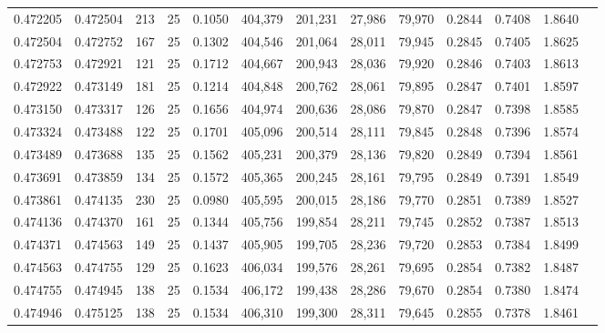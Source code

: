 \begin{tabular}{rrrrrrrrrrrrr}
0.472205 & 0.472504 &   213 &  25 &                                     0.1050 & 404,379 & 201,231 &  27,986 &  79,970 & 0.2844 & 0.7408 & 1.8640 \\
0.472504 & 0.472752 &   167 &  25 &                                     0.1302 & 404,546 & 201,064 &  28,011 &  79,945 & 0.2845 & 0.7405 & 1.8625 \\
0.472753 & 0.472921 &   121 &  25 &                                     0.1712 & 404,667 & 200,943 &  28,036 &  79,920 & 0.2846 & 0.7403 & 1.8613 \\
0.472922 & 0.473149 &   181 &  25 &                                     0.1214 & 404,848 & 200,762 &  28,061 &  79,895 & 0.2847 & 0.7401 & 1.8597 \\
0.473150 & 0.473317 &   126 &  25 &                                     0.1656 & 404,974 & 200,636 &  28,086 &  79,870 & 0.2847 & 0.7398 & 1.8585 \\
0.473324 & 0.473488 &   122 &  25 &                                     0.1701 & 405,096 & 200,514 &  28,111 &  79,845 & 0.2848 & 0.7396 & 1.8574 \\
0.473489 & 0.473688 &   135 &  25 &                                     0.1562 & 405,231 & 200,379 &  28,136 &  79,820 & 0.2849 & 0.7394 & 1.8561 \\
0.473691 & 0.473859 &   134 &  25 &                                     0.1572 & 405,365 & 200,245 &  28,161 &  79,795 & 0.2849 & 0.7391 & 1.8549 \\
0.473861 & 0.474135 &   230 &  25 &                                     0.0980 & 405,595 & 200,015 &  28,186 &  79,770 & 0.2851 & 0.7389 & 1.8527 \\
0.474136 & 0.474370 &   161 &  25 &                                     0.1344 & 405,756 & 199,854 &  28,211 &  79,745 & 0.2852 & 0.7387 & 1.8513 \\
0.474371 & 0.474563 &   149 &  25 &                                     0.1437 & 405,905 & 199,705 &  28,236 &  79,720 & 0.2853 & 0.7384 & 1.8499 \\
0.474563 & 0.474755 &   129 &  25 &                                     0.1623 & 406,034 & 199,576 &  28,261 &  79,695 & 0.2854 & 0.7382 & 1.8487 \\
0.474755 & 0.474945 &   138 &  25 &                                     0.1534 & 406,172 & 199,438 &  28,286 &  79,670 & 0.2854 & 0.7380 & 1.8474 \\
0.474946 & 0.475125 &   138 &  25 &                                     0.1534 & 406,310 & 199,300 &  28,311 &  79,645 & 0.2855 & 0.7378 & 1.8461 \\

\end{tabular}
